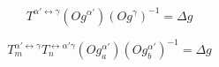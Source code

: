$$T^{\alpha'\leftrightarrow\gamma}\left(Og^{\alpha'}\right)\left(Og^{\gamma}\right)^{-1} = \Delta g \label{eq:1}$$

$$T_{m}^{\alpha'\leftrightarrow\gamma}T_{n}^{\leftrightarrow\alpha'\gamma}\left(Og_{a}^{\alpha'}\right)\left(Og_{b}^{\alpha'}\right)^{-1} = \Delta g \label{eq:2}$$
